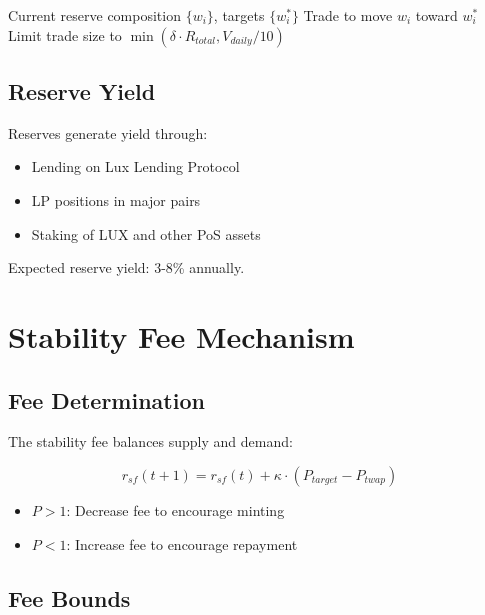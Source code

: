 \documentclass[11pt,a4paper]{article}
\begin{document}
\begin{algorithm}
\caption{Reserve Rebalancing}
\begin{algorithmic}[1]
\Require Current reserve composition $\{w_i\}$, targets $\{w_i^*\}$
        \State Trade to move $w_i$ toward $w_i^*$
        \State Limit trade size to $\min(\delta \cdot R_{total}, V_{daily}/10)$
    \EndIf
\EndFor
\end{algorithmic}
\end{algorithm}

\subsection{Reserve Yield}

Reserves generate yield through:
\begin{itemize}
    \item Lending on Lux Lending Protocol
    \item LP positions in major pairs
    \item Staking of LUX and other PoS assets
\end{itemize}

Expected reserve yield: 3-8\% annually.

\section{Stability Fee Mechanism}

\subsection{Fee Determination}

The stability fee balances supply and demand:

\begin{equation}
    r_{sf}(t+1) = r_{sf}(t) + \kappa \cdot (P_{target} - P_{twap})
\end{equation}

\begin{itemize}
    \item $P > 1$: Decrease fee to encourage minting
    \item $P < 1$: Increase fee to encourage repayment
\end{itemize}

\subsection{Fee Bounds}
\end{document}

